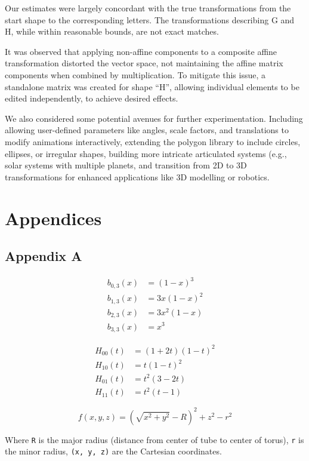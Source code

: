 \documentclass[10pt,a4paper]{article}
\begin{document}
Our estimates were largely concordant with the true transformations from the start shape to the corresponding letters. The transformations describing G and H, while within reasonable bounds, are not exact matches. 

It was observed that applying non-affine components to a composite affine transformation distorted the vector space, not maintaining the affine matrix components when combined by multiplication. To mitigate this issue, a standalone matrix was created for shape “H”, allowing individual elements to be edited independently, to achieve desired effects. 

We also considered some potential avenues for further experimentation. Including allowing user-defined parameters like angles, scale factors, and translations to modify animations interactively, extending the polygon library to include circles, ellipses, or irregular shapes, building more intricate articulated systems (e.g., solar systems with multiple planets, and transition from 2D to 3D transformations for enhanced applications like 3D modelling or robotics.

\section{Appendices}

\subsection{Appendix A}

\begin{align}
b_{0,3}(x) &= (1-x)^3 \\
b_{1,3}(x) &= 3x(1-x)^2 \\
b_{2,3}(x) &= 3x^2(1-x) \\
b_{3,3}(x) &= x^3
\end{align}

\begin{align}
H_{00}(t) &= (1 + 2t)(1 - t)^2 \\
H_{10}(t) &= t(1 - t)^2 \\
H_{01}(t) &= t^2(3 - 2t) \\
H_{11}(t) &= t^2(t - 1)
\end{align}

\begin{equation}
f(x, y, z) = \left(\sqrt{x^2 + y^2} - R\right)^2 + z^2 - r^2 
\end{equation}

Where \texttt{R} is the major radius (distance from center of tube to center of torus), \texttt{r} is the minor radius, \texttt{(x, y, z)} are the Cartesian coordinates.
\end{document}

